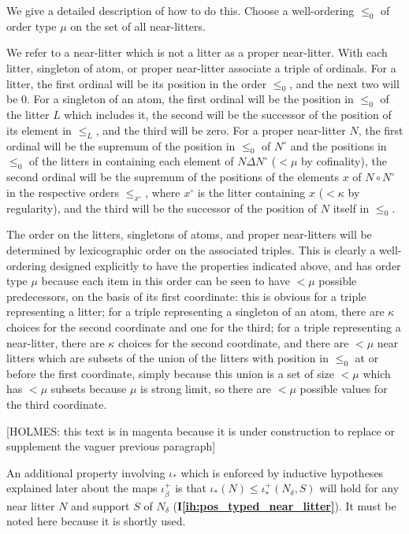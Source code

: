 \documentclass[112pt]{article}
\theoremstyle{definition}
\theoremstyle{remark}
\newcommand{\ihref}[1]{(\textbf{I\ref{#1}})}
\newcommand{\hsuggest}[1]{{\color{magenta}#1}}
\begin{document}
\hsuggest{We give a detailed description of how to do this. Choose a well-ordering $\leq_0$ of order type $\mu$ on the set of all near-litters.  

We refer to a near-litter which is not a litter as a proper near-litter.  With each litter, singleton of atom, or proper near-litter associate a triple of ordinals.  For a litter, the first ordinal will be its position in the order $\leq_0$, and the next two will be 0.  For a singleton of an atom, the first ordinal will be the position in $\leq_0$ of the  litter $L$ which includes it, the second will be the successor of the position of its element in $\leq_L$, and the third will be zero.   For a proper near-litter $N$, the first ordinal will be the supremum of the position in $\leq_0$ of $N^\circ$ and the positions in $\leq_0$ of the litters in containing each element of $N\Delta N^\circ$ ($<\mu$ by cofinality), the second ordinal will be the supremum of the positions of the elements $x$ of $N \circ N^\circ$ in the respective orders $\leq_{x^\circ}$, where $x^\circ$ is the litter containing $x$ ($<\kappa$ by regularity), and the third will be the successor of the position of $N$ itself in $\leq_0$.

The order on the litters, singletons of atoms, and proper near-litters will be determined by lexicographic order on the associated triples.  This is clearly a well-ordering designed explicitly to have the properties indicated above, and has order type $\mu$ because each item in this order can be seen to have $<\mu$ possible predecessors, on the basis of its first coordinate:  this is obvious for a triple representing a litter;  for a triple representing a singleton of an atom, there are $\kappa$ choices for the second coordinate and one for the third;  for a triple representing a near-litter, there are $\kappa$ choices for the second coordinate, and there are $<\mu$ near litters which are subsets of the union of the litters with position in $\leq_0$ at or before the first coordinate, simply because this union is a set of size $<\mu$ which has $<\mu$ subsets because $\mu$ is strong limit, so there are $<\mu$ possible values for the third coordinate.

[HOLMES:  this text is in magenta because it is under construction to replace or supplement the vaguer previous paragraph]}


An additional property involving $\iota_*$ which is enforced by inductive hypotheses explained later about the maps $\iota_\beta^+$ is that $\iota_*(N) \leq \iota_*^+(N_\delta,S)$ will hold for any near litter $N$ and support $S$ of $N_\delta$ \ihref{ih:pos_typed_near_litter}.  It must be noted here because it is shortly used.
\end{document}
